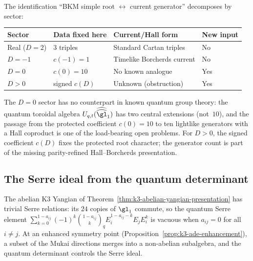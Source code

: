 \begin{remark}
\label{rem:bkm-yangian-framework}
The identification ``BKM simple root $\leftrightarrow$ current generator'' decomposes by sector:
\begin{center}
\begin{tabular}{llll}
\toprule
\textbf{Sector} & \textbf{Data fixed here} & \textbf{Current/Hall form} & \textbf{New input} \\
\midrule
Real ($D = 2$) & $3$ triples & Standard Cartan triples & No \\
$D = -1$ & $c(-1)=1$ & Timelike Borcherds current & No \\
$D = 0$ & $c(0)=10$ & No known analogue & Yes \\
$D > 0$ & signed $c(D)$ & Unknown (obstruction) & Yes \\
\bottomrule
\end{tabular}
\end{center}
The $D = 0$ sector has no counterpart in known quantum group theory: the quantum toroidal algebra $U_{q,t}(\widehat{\widehat{\gl}}_1)$ has two central extensions (not~$10$), and the passage from the protected coefficient $c(0)=10$ to ten lightlike generators with a Hall coproduct is one of the load-bearing open problems. For $D>0$, the signed coefficient $c(D)$ fixes the protected root character; the generator count is part of the missing parity-refined Hall--Borcherds presentation.
\end{remark}


\subsection{The Serre ideal from the quantum determinant}
\label{subsec:k3-serre-from-qdet}

\noindent The abelian K3 Yangian of Theorem~\ref{thm:k3-abelian-yangian-presentation}
has trivial Serre relations: its $24$ copies of $\gl_1$ commute, so
the quantum Serre element $\sum_{k=0}^{1-a_{ij}} (-1)^k
\binom{1-a_{ij}}{k}_q E_i^{1-a_{ij}-k} E_j E_i^k$ is vacuous when
$a_{ij} = 0$ for all $i \neq j$.
At an enhanced symmetry point (Proposition~\ref{prop:k3-ade-enhancement}),
a subset of the Mukai directions merges into a non-abelian subalgebra,
and the quantum determinant controls the Serre ideal.

